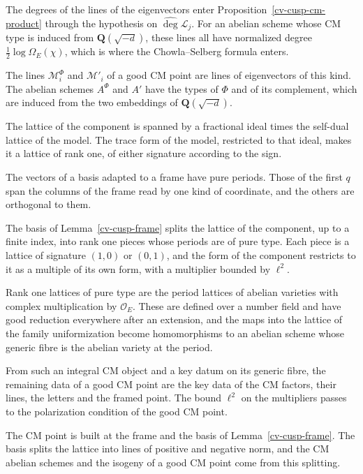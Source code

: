 The degrees of the lines of the eigenvectors enter Proposition~\ref{cv-cusp-cm-product} through the hypothesis on
$\widehat\deg\mathcal L_j$. For an abelian scheme whose CM type is induced from $\mathbf Q(\sqrt{-d})$, these lines
all have normalized degree $\frac12\log\Omega_E(\chi)$, which is where the Chowla--Selberg formula enters.

The lines $\mathcal M^\Phi_i$ and $\mathcal M'_i$ of a good CM point are lines of eigenvectors of this kind. The
abelian schemes $A^\Phi$ and $A'$ have the types of $\Phi$ and of its complement, which are induced from the two
embeddings of $\mathbf Q(\sqrt{-d})$.

The lattice of the component is spanned by a fractional ideal times the self-dual lattice of the model. The trace form of
the model, restricted to that ideal, makes it a lattice of rank one, of either signature according to the sign.

The vectors of a basis adapted to a frame have pure periods. Those of the first $q$ span the columns of the frame read by
one kind of coordinate, and the others are orthogonal to them.

The basis of Lemma~\ref{cv-cusp-frame} splits the lattice of the component, up to a finite index, into rank one pieces
whose periods are of pure type. Each piece is a lattice of signature $(1,0)$ or $(0,1)$, and the form of the component
restricts to it as a multiple of its own form, with a multiplier bounded by $\ell^2$.

Rank one lattices of pure type are the period lattices of abelian varieties with complex multiplication by
$\mathcal O_E$. These are defined over a number field and have good reduction everywhere after an extension, and the maps
into the lattice of the family uniformization become homomorphisms to an abelian scheme whose generic fibre is the
abelian variety at the period.

From such an integral CM object and a key datum on its generic fibre, the remaining data of a good CM point are the key
data of the CM factors, their lines, the letters and the framed point. The bound $\ell^2$ on the multipliers passes to
the polarization condition of the good CM point.

The CM point is built at the frame and the basis of Lemma~\ref{cv-cusp-frame}. The basis splits the lattice into
lines of positive and negative norm, and the CM abelian schemes and the isogeny of a good CM point come from this
splitting.

